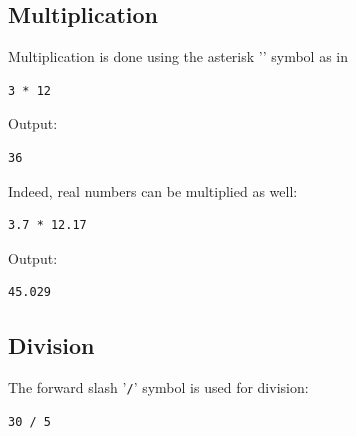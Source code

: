 \documentclass[article,A4,12pt]{llncs}
\begin{document}
\noindent

\subsection{Multiplication}
Multiplication is done using the asterisk  '{\tt *}' symbol as in\\

\begin{bbox}
\begin{verbatim}
3 * 12
\end{verbatim}
\end{bbox}
\vspace{6mm}

\noindent
Output:\\

\begin{ybox}
\begin{verbatim}
36
\end{verbatim}
\end{ybox}
\vspace{6mm}

\noindent
Indeed, real numbers can be multiplied as well:\\

\begin{bbox}
\begin{verbatim}
3.7 * 12.17
\end{verbatim}
\end{bbox}
\vspace{6mm}

\noindent
Output:\\

\begin{ybox}
\begin{verbatim}
45.029
\end{verbatim}
\end{ybox}
\vspace{6mm}

\noindent

\subsection{Division}
The forward slash '{\tt /}' symbol is used for division:\\

\begin{bbox}
\begin{verbatim}
30 / 5
\end{verbatim}
\end{bbox}
\vspace{6mm}
\end{document}
